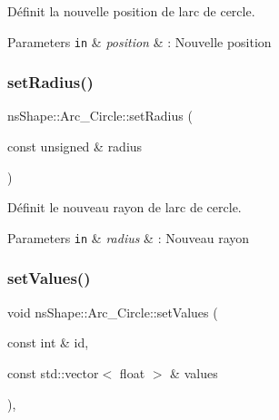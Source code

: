 Définit la nouvelle position de l\textquotesingle{}arc de cercle. 


\begin{DoxyParams}[1]{Parameters}
\mbox{\tt in}  & {\em position} & \+: Nouvelle position \\
\hline
\end{DoxyParams}
\mbox{\label{classns_shape_1_1_arc___circle_ac0dac107441139a53881faa0be110eaa}} 
\subsubsection{\texorpdfstring{set\+Radius()}{setRadius()}}
{\footnotesize\ttfamily ns\+Shape\+::\+Arc\+\_\+\+Circle\+::set\+Radius (\begin{DoxyParamCaption}\item[{const unsigned \&}]{radius }\end{DoxyParamCaption})}



Définit le nouveau rayon de l\textquotesingle{}arc de cercle. 


\begin{DoxyParams}[1]{Parameters}
\mbox{\tt in}  & {\em radius} & \+: Nouveau rayon \\
\hline
\end{DoxyParams}
\mbox{\label{classns_shape_1_1_arc___circle_aa59b45d2a10ec5f8fd030d4ec46721b6}} 
\subsubsection{\texorpdfstring{set\+Values()}{setValues()}}
{\footnotesize\ttfamily void ns\+Shape\+::\+Arc\+\_\+\+Circle\+::set\+Values (\begin{DoxyParamCaption}\item[{const int \&}]{id,  }\item[{const std\+::vector$<$ float $>$ \&}]{values }\end{DoxyParamCaption})\hspace{0.3cm}{\ttfamily [override]}, {\ttfamily [virtual]}}



